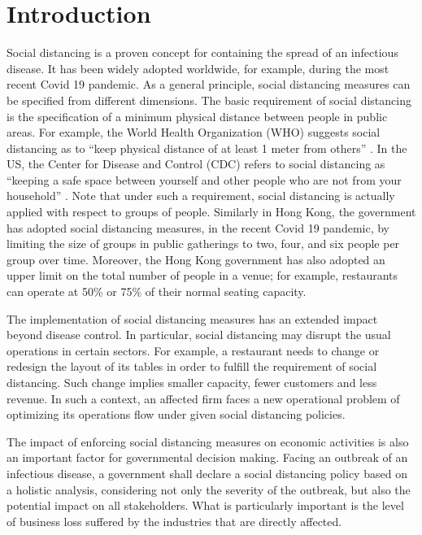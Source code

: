 \section{Introduction}
Social distancing is a proven concept for containing the spread of an infectious disease. It has been widely adopted worldwide, for example, during the most recent Covid 19 pandemic. As a general principle, social distancing measures can be specified from different dimensions. The basic requirement of social distancing is the specification of a minimum physical distance between people in public areas. For example, the World Health Organization (WHO) suggests social distancing as to ``keep physical distance of at least 1 meter from others'' \cite{AdviceforPublic}. In the US, the Center for Disease and Control (CDC) refers to social distancing as ``keeping a safe space between yourself and other people who are not from your household'' \cite{CDC}.
Note that under such a requirement, social distancing is actually applied with respect to groups of people. Similarly in Hong Kong, the government has adopted social distancing measures, in the recent Covid 19 pandemic, by limiting the size of groups in public gatherings to two, four, and six people per group over time. Moreover, the Hong Kong government has also adopted an upper limit on the total number of people in a venue; for example, restaurants can operate at 50\% or 75\% of their normal seating capacity.



The implementation of social distancing measures has an extended impact beyond disease control. In particular, social distancing may disrupt the usual operations in certain sectors. For example, a restaurant needs to change or redesign the layout of its tables in order to fulfill the requirement of social distancing. Such change implies smaller capacity, fewer customers and less revenue. In such a context, an affected firm faces a new operational problem of optimizing its operations flow under given social distancing policies.

The impact of enforcing social distancing measures on economic activities is also an important factor for governmental decision making. Facing an outbreak of an infectious disease, a government shall declare a social distancing policy based on a holistic analysis, considering not only the severity of the outbreak, but also the potential impact on all stakeholders. What is particularly important is the level of business loss suffered by the industries that are directly affected.  
 

